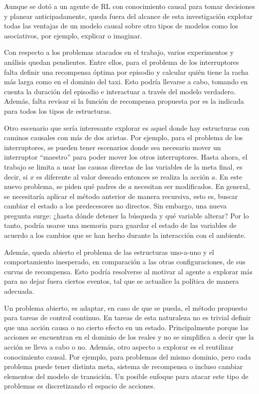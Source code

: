 Aunque se dotó a un agente de RL con conocimiento causal para tomar decisiones y planear anticipadamente, queda fuera del alcance de esta investigación explotar todas las ventajas de un modelo causal sobre otro tipos de modelos como los asociativos, por ejemplo, explicar o imaginar.

Con respecto a los problemas atacados en el trabajo,
varios experimentos y análisis quedan pendientes. Entre ellos, 
para el problema de los interruptores falta 
definir una recompensa óptima por episodio y 
calcular quién tiene la racha más larga como en el dominio del taxi.  
Esto podría llevarse a cabo, tomando en cuenta la duración del episodio
e interactuar a través del modelo verdadero. Además, falta revisar si la función
de recompensa propuesta por \citet{nair2019causal} es la indicada para todos
los tipos de estructuras.

Otro escenario que sería interesante
explorar es aquel donde hay estructuras con caminos causales con más de dos aristas. Por ejemplo, para el problema de los interruptores, se pueden
tener escenarios donde sea necesario mover un interruptor ``maestro'' para
poder mover los otros interruptores. 
Hasta ahora, el trabajo se limita a usar las causas directas de las variables de la meta final, es decir, si $x$ es diferente al valor deseado entonces se realiza la acción $a$.
En este nuevo problema, se piden qué padres de $a$ necesitan ser modificados.
En general, se necesitaría aplicar el método anterior de manera recursiva, esto es, buscar cambiar el estado a los predecesores no directos.
Sin embargo, una nueva pregunta surge: ¿hasta dónde detener la búsqueda y qué variable alterar? Por lo tanto, podría usarse una memoria para guardar el estado de las variables de acuerdo a los cambios que se han hecho durante la interacción con el ambiente.

Además, queda abierto el problema
de las estructuras uno-a-uno y el comportamiento inesperado, en comparación
a las otras configuraciones, de sus curvas de recompensa. Esto podría resolverse
al motivar al agente a explorar más para no dejar fuera ciertos eventos,
tal que se actualice la política de manera adecuada.

Un problema abierto, es adaptar, en caso de que se pueda, el método propuesto para 
tareas de control continuo. En tareas de esta naturaleza no es trivial definir que una acción
causa o no cierto efecto en un estado. Principalmente porque las acciones se encuentran
en el dominio de los reales y no se simplifica a decir que la acción se lleva a cabo o no.
Además, otro aspecto a explorar es el reutilizar conocimiento causal. Por ejemplo, 
para problemas del mismo dominio, pero cada problema puede tener distinta meta, sistema
de recompensa o incluso cambiar elementos del modelo de transición.
Un posible enfoque para atacar este tipo de problemas es discretizando el espacio de acciones.

